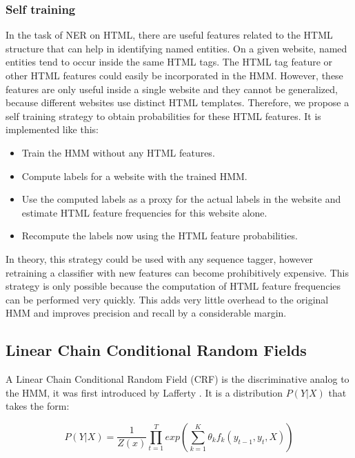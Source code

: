 \documentclass{nle}
\begin{document}
\subsubsection{Self training} \label{sssec:self_training}

In the task of NER on HTML, there are useful features related to the HTML
structure that can help in identifying named entities. On a given website, named
entities tend to occur inside the same HTML tags. The HTML tag feature or other
HTML features could easily be incorporated in the HMM. However, these 
features are only useful inside a single website and they cannot be generalized, 
because different websites use distinct HTML templates. 
Therefore, we propose a self training strategy to obtain probabilities for
these HTML features. It is implemented like this:

\begin{itemize}
\item Train the HMM without any HTML features.
\item Compute labels for a website with the trained HMM.
\item Use the computed labels as a proxy for the actual labels in the 
website and estimate HTML feature frequencies for this website alone.
\item Recompute the labels now using the HTML feature probabilities.
\end{itemize}

In theory, this strategy could be used with any sequence tagger, however
retraining a classifier with new features can become prohibitively expensive.
This strategy is only possible because the computation of HTML feature
frequencies can be performed very quickly. This adds very little overhead 
to the original HMM and improves precision and recall by a considerable 
margin.

\subsection{Linear Chain Conditional Random Fields}

A Linear Chain Conditional Random Field (CRF) is the discriminative analog to the HMM,
it was first introduced by Lafferty . It is a distribution $ P(Y|X) $ that takes the form:

\begin{equation}
P(Y|X) = \frac{1}{Z(x)} \prod_{t=1}^{T} exp \left( \sum_{k=1}^{K} \theta_k f_k(y_{t-1}, y_t, X) \right)
\end{equation}
\\
\end{document}
